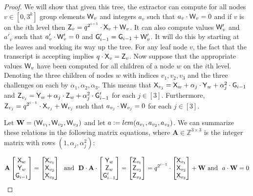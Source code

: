 \documentclass[12pt]{article}
\theoremstyle{Definition}
\begin{document}
\begin{proof}
We will show that given this tree, the extractor can compute for all nodes $v \in [0, 3^k]$ group elements $\mathsf{W}_v$ and integers $a_v$ such that $a_v \cdot \mathsf{W}_v = 0$ and if $v$ is on the $i$th level then $\mathsf{Z}_v = q^{2^{i-1}} \cdot \mathsf{X}_v + \mathsf{W}_v$. It can also compute values $\mathsf{W}'_v$ and $a'_v$ such that $a'_v \cdot \mathsf{W}'_v = 0$ and $\mathsf{G}'_{i-1} = \mathsf{G}_{i-1} + \mathsf{W}'_v$. It will do this by starting at the leaves and working its way up the tree.
For any leaf node $v$, the fact that the transcript is accepting implies $q \cdot \mathsf{X}_v = \mathsf{Z}_v$. Now suppose that the appropriate values $\mathsf{W}_v$ have been computed for all children of a node $w$ on the $i$th level. Denoting the three children of nodes $w$ with indices $v_1, v_2, v_3$ and the three challenges on each by $\alpha_1, \alpha_2, \alpha_3$. This means that $\mathsf{X}_{v_j} = \mathsf{X}_w + \alpha_j \cdot \mathsf{Y}_w + \alpha_j^2 \cdot \mathsf{G}_{i-1}$ and $\mathsf{Z}_{v_j} = \mathsf{Y}_w + \alpha_j \cdot \mathsf{Z}_w + \alpha^2_j \cdot \mathsf{G}'_{i-1}$ for each $j \in [3]$.
Furthermore, $\mathsf{Z}_{v_j} = q^{2^{i-1}} \cdot \mathsf{X}_{v_j} + \mathsf{W}_{v_j}$ such that $a_{v_j} \cdot \mathsf{W}_{v_j} = 0$ for each $j \in [3]$. 

Let $\mathbf{W} = (\mathsf{W}_{v_1}, \mathsf{W}_{v_2}, \mathsf{W}_{v_3})$ and let $a \mathrel{\mathop:}= lcm(a_{v_1}, a_{v_2}, a_{v_3})$. We can summarize these relations in the following matrix equations, where $\mathbf{A} \in \mathbb{Z}^{3\times 3}$ is the integer matrix with rows $(1, \alpha_j, \alpha_j^2)$:

$$\mathbf{A}
\begin{bmatrix}
\gr{X}_w \\ 
\gr{Y}_w \\ 
\gr{G}_{i-1}
\end{bmatrix} 
=  
\begin{bmatrix}
\gr{X}_{v_1} \\ 
\gr{X}_{v_2} \\ 
\gr{X}_{v_3}
\end{bmatrix}
\ \ \text{and} \ \ 
\mathbf{D} \cdot 
\mathbf{A} \cdot 
\begin{bmatrix}
\gr{Y}_w \\ 
\gr{Z}_w \\ 
\gr{G}'_{i-1}
\end{bmatrix} 
= 
\begin{bmatrix}
\gr{Z}_{v_1} \\ 
\gr{Z}_{v_2} \\ 
\gr{Z}_{v_3}
\end{bmatrix} 
= 
q^{2^{i-1}} \cdot 
\begin{bmatrix}
\gr{X}_{v_1} \\ 
\gr{X}_{v_2} \\ 
\gr{X}_{v_3}
\end{bmatrix}
+ 
\mathbf{W}  
\ \text{and} \ \ a \cdot \mathbf{W} = 0
$$


\end{proof}
\end{document}
